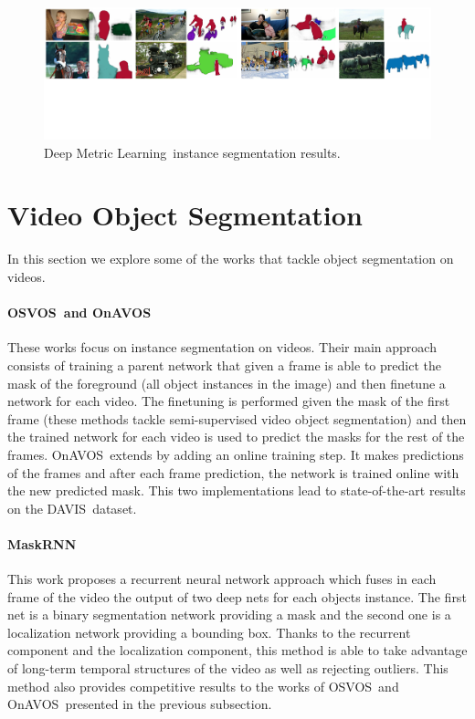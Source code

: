 \begin{figure}[h]
  \centering
  \includegraphics[width=1.\linewidth]{figures/deep_metric_learning/mask_classification.pdf}
  \caption{Deep Metric Learning~\deepml instance segmentation results. }
  \label{fig:deep_metric_learning}
\end{figure}

\section{Video Object Segmentation}
\label{sec:soa:videoobjectsegmentation}

In this section we explore some of the works that tackle object segmentation on videos.

\paragraph{OSVOS~\osvos and OnAVOS~\onavos}
These works focus on instance segmentation on videos.
Their main approach consists of training a parent network that given a frame is able to predict the mask of the foreground (all object instances in the image) and then finetune a network for each video.
The finetuning is performed given the mask of the first frame (these methods tackle semi-supervised video object segmentation) and then the trained network for each video is used to predict the masks for the rest of the frames.
OnAVOS~\onavos extends \osvos by adding an online training step.
It makes predictions of the frames and after each frame prediction, the network is trained online with the new predicted mask.
This two implementations lead to state-of-the-art results on the DAVIS~\davisboth dataset.

\paragraph{MaskRNN~\maskrnn}
This work proposes a recurrent neural network approach which fuses in each frame of the video the output of two deep nets for each objects instance.
The first net is a binary segmentation network providing a mask and the second one is a localization network providing a bounding box.
Thanks to the recurrent component and the localization component, this method is able to take advantage of long-term temporal structures of the video as well as rejecting outliers.
This method also provides competitive results to the works of OSVOS~\osvos and OnAVOS~\onavos presented in the previous subsection.

